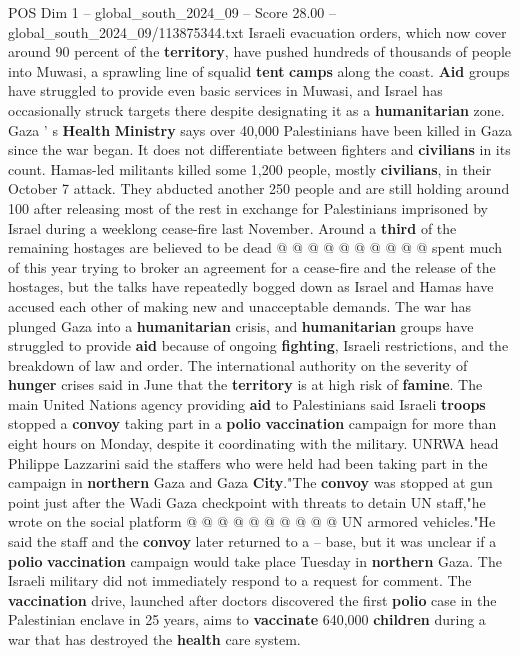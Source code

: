 \begin{textsample}{POS Dim 1 – global\_south\_2024\_09 – Score 28.00 – global\_south\_2024\_09/113875344.txt}
Israeli evacuation orders, which now cover around 90 percent of the \textbf{territory}, have pushed hundreds of thousands of people into Muwasi, a sprawling line of squalid \textbf{tent} \textbf{camps} along the coast. \textbf{Aid} groups have struggled to provide even basic services in Muwasi, and Israel has occasionally struck targets there despite designating it as a \textbf{humanitarian} zone.
Gaza ' s \textbf{Health} \textbf{Ministry} says over 40,000 Palestinians have been killed in Gaza since the war began.
It does not differentiate between fighters and \textbf{civilians} in its count.
Hamas-led militants killed some 1,200 people, mostly \textbf{civilians}, in their October 7 attack.
They abducted another 250 people and are still holding around 100 after releasing most of the rest in exchange for Palestinians imprisoned by Israel during a weeklong cease-fire last November.
Around a \textbf{third} of the remaining hostages are believed to be dead @ @ @ @ @ @ @ @ @ @ spent much of this year trying to broker an agreement for a cease-fire and the release of the hostages, but the talks have repeatedly bogged down as Israel and Hamas have accused each other of making new and unacceptable demands.
The war has plunged Gaza into a \textbf{humanitarian} crisis, and \textbf{humanitarian} groups have struggled to provide \textbf{aid} because of ongoing \textbf{fighting}, Israeli restrictions, and the breakdown of law and order.
The international authority on the severity of \textbf{hunger} crises said in June that the \textbf{territory} is at high risk of \textbf{famine}.
The main United Nations agency providing \textbf{aid} to Palestinians said Israeli \textbf{troops} stopped a \textbf{convoy} taking part in a \textbf{polio} \textbf{vaccination} campaign for more than eight hours on Monday, despite it coordinating with the military.
UNRWA head Philippe Lazzarini said the staffers who were held had been taking part in the campaign in \textbf{northern} Gaza and Gaza \textbf{City}."The \textbf{convoy} was stopped at gun point just after the Wadi Gaza checkpoint with threats to detain UN staff,"he wrote on the social platform @ @ @ @ @ @ @ @ @ @ UN armored vehicles."He said the staff and the \textbf{convoy} later returned to a -- base, but it was unclear if a \textbf{polio} \textbf{vaccination} campaign would take place Tuesday in \textbf{northern} Gaza.
The Israeli military did not immediately respond to a request for comment.
The \textbf{vaccination} drive, launched after doctors discovered the first \textbf{polio} case in the Palestinian enclave in 25 years, aims to \textbf{vaccinate} 640,000 \textbf{children} during a war that has destroyed the \textbf{health} care system.

\end{textsample}
